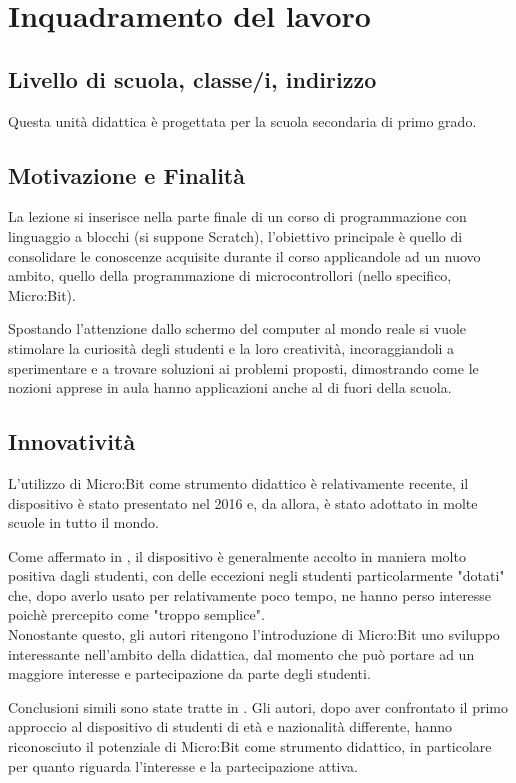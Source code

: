 \documentclass[../../relazione.tex]{subfiles}
\begin{document}
\section{Inquadramento del lavoro}

\subsection{Livello di scuola, classe/i, indirizzo}
Questa unità didattica è progettata per la scuola secondaria di primo grado.

\subsection{Motivazione e Finalità}
La lezione si inserisce nella parte finale di un corso di programmazione con linguaggio a blocchi (si suppone Scratch), l'obiettivo principale è quello di consolidare le conoscenze acquisite durante il corso applicandole ad un nuovo ambito, quello della programmazione di microcontrollori (nello specifico, Micro:Bit).

Spostando l'attenzione dallo schermo del computer al mondo reale si vuole stimolare la curiosità degli studenti e la loro creatività, incoraggiandoli a sperimentare e a trovare soluzioni ai problemi proposti, dimostrando come le nozioni apprese in aula hanno applicazioni anche al di fuori della scuola.

\subsection{Innovatività}
L'utilizzo di Micro:Bit come strumento didattico è relativamente recente, il dispositivo è stato presentato nel 2016 e, da allora, è stato adottato in molte scuole in tutto il mondo.

Come affermato in \cite{10.1145/3137065.3137083}, il dispositivo è generalmente accolto in maniera molto positiva dagli studenti, con delle eccezioni negli studenti particolarmente "dotati" che, dopo averlo usato per relativamente poco tempo, ne hanno perso interesse poichè prercepito come "troppo semplice".\\
Nonostante questo, gli autori ritengono l'introduzione di Micro:Bit uno sviluppo interessante nell'ambito della didattica, dal momento che può portare ad un maggiore interesse e partecipazione da parte degli studenti.

Conclusioni simili sono state tratte in \cite{8424786}. Gli autori, dopo aver confrontato il primo approccio al dispositivo di studenti di età e nazionalità differente, hanno riconosciuto il potenziale di Micro:Bit come strumento didattico, in particolare per quanto riguarda l'interesse e la partecipazione attiva.
\end{document}
